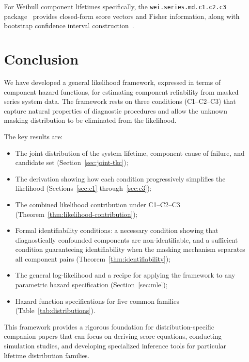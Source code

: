 \documentclass[11pt]{article}
\theoremstyle{definition}
\theoremstyle{plain}
\begin{document}
For Weibull component lifetimes specifically, the
\texttt{wei.series.md.c1.c2.c3}
package~\citep{towell2023weibull} provides closed-form score
vectors and Fisher information, along with bootstrap confidence
interval construction~\citep{towell2023algebraic-mle}.


\section{Conclusion}
\label{sec:conclusion}

We have developed a general likelihood framework, expressed in terms of
component hazard functions, for estimating component reliability from
masked series system data.
The framework rests on three conditions (C1--C2--C3) that capture natural
properties of diagnostic procedures and allow the unknown masking
distribution to be eliminated from the likelihood.

The key results are:
\begin{itemize}
    \item The joint distribution of the system lifetime, component cause
    of failure, and candidate set
    (Section~\ref{sec:joint-tkc});
    \item The derivation showing how each condition progressively
    simplifies the likelihood (Sections~\ref{sec:c1}
    through~\ref{sec:c3});
    \item The combined likelihood contribution under C1--C2--C3
    (Theorem~\ref{thm:likelihood-contribution});
    \item Formal identifiability conditions: a necessary condition
    showing that diagnostically confounded components are
    non-identifiable, and a sufficient condition guaranteeing
    identifiability when the masking mechanism separates all
    component pairs (Theorem~\ref{thm:identifiability});
    \item The general log-likelihood and a recipe for applying the
    framework to any parametric hazard specification
    (Section~\ref{sec:mle});
    \item Hazard function specifications for five common families
    (Table~\ref{tab:distributions}).
\end{itemize}

This framework provides a rigorous foundation for distribution-specific
companion papers that can focus on deriving score equations, conducting
simulation studies, and developing specialized inference tools for
particular lifetime distribution families.



\end{document}
